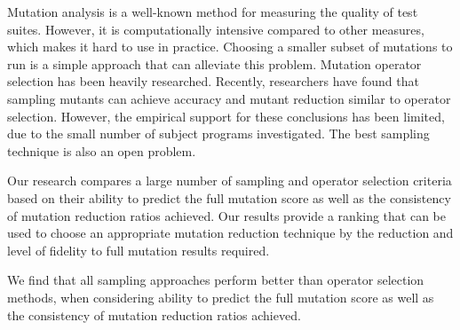 Mutation analysis is a well-known method for measuring the quality of
test suites. However, it is computationally intensive compared to
other measures, which makes it hard to use in practice. Choosing a
smaller subset of mutations to run is a simple approach that can
alleviate this problem.  Mutation operator selection has been heavily
researched. Recently, researchers have found that sampling mutants can
achieve accuracy and mutant reduction similar to operator selection.
%
However, the empirical support for these conclusions has been limited, due to the small number of subject programs investigated.  The best sampling technique is also an open problem.


Our research compares a large number of sampling and operator
selection criteria based on their ability to predict the full mutation
score as well as the consistency of mutation reduction ratios
achieved. Our results provide a ranking that can be used to choose an
appropriate mutation reduction technique by the reduction and level of fidelity to full mutation results required.



We find that all sampling approaches perform better than operator
selection methods, when considering ability to predict the full
mutation score as well as the consistency of mutation reduction ratios
achieved.


